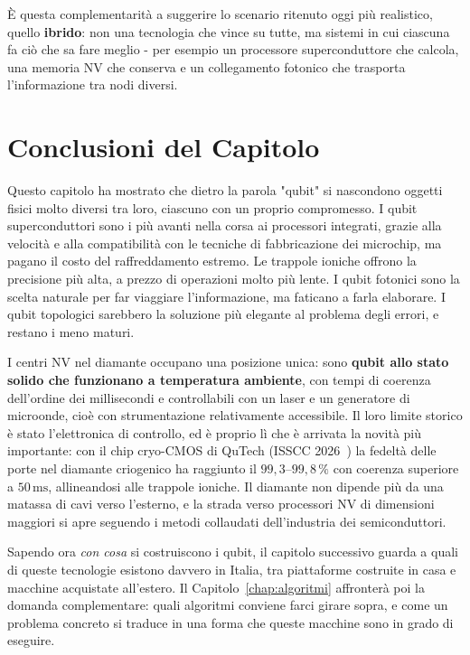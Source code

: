 È questa complementarità a suggerire lo scenario ritenuto oggi più realistico,
quello \textbf{ibrido}: non una tecnologia che vince su tutte, ma sistemi in
cui ciascuna fa ciò che sa fare meglio - per esempio un processore
superconduttore che calcola, una memoria NV che conserva e un collegamento
fotonico che trasporta l'informazione tra nodi diversi.

\section{Conclusioni del Capitolo}
\label{sec:conclusioni-hw}

Questo capitolo ha mostrato che dietro la parola "qubit" si nascondono oggetti
fisici molto diversi tra loro, ciascuno con un proprio compromesso. I qubit
superconduttori sono i più avanti nella corsa ai processori integrati, grazie
alla velocità e alla compatibilità con le tecniche di fabbricazione dei
microchip, ma pagano il costo del raffreddamento estremo. Le trappole ioniche
offrono la precisione più alta, a prezzo di operazioni molto più lente. I qubit
fotonici sono la scelta naturale per far viaggiare l'informazione, ma faticano
a farla elaborare. I qubit topologici sarebbero la soluzione più elegante al
problema degli errori, e restano i meno maturi.

I centri NV nel diamante occupano una posizione unica: sono \textbf{qubit allo
stato solido che funzionano a temperatura ambiente}, con tempi di coerenza
dell'ordine dei millisecondi e controllabili con un laser e un generatore di
microonde, cioè con strumentazione relativamente accessibile. Il loro limite
storico è stato l'elettronica di controllo, ed è proprio lì che è arrivata la
novità più importante: con il chip cryo-CMOS di QuTech (ISSCC
2026~\cite{babaie2026cryogenic}) la fedeltà delle porte nel diamante criogenico
ha raggiunto il $99{,}3$--$99{,}8\,\%$ con coerenza superiore a $50\,\text{ms}$,
allineandosi alle trappole ioniche. Il diamante non dipende più da una matassa
di cavi verso l'esterno, e la strada verso processori NV di dimensioni
maggiori si apre seguendo i metodi collaudati dell'industria dei semiconduttori.

Sapendo ora \textit{con cosa} si costruiscono i qubit, il capitolo successivo
guarda a quali di queste tecnologie esistono davvero in Italia, tra
piattaforme costruite in casa e macchine acquistate all'estero. Il
Capitolo~\ref{chap:algoritmi} affronterà poi la domanda complementare: quali
algoritmi conviene farci girare sopra, e come un problema concreto si traduce
in una forma che queste macchine sono in grado di eseguire.
